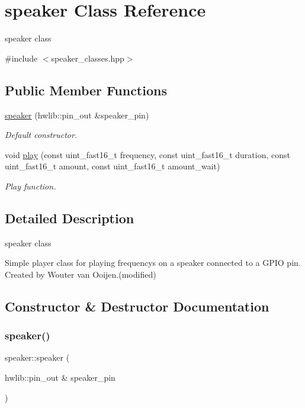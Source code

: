\hypertarget{classspeaker}{}\section{speaker Class Reference}
\label{classspeaker}


speaker class  




{\ttfamily \#include $<$speaker\+\_\+classes.\+hpp$>$}

\subsection*{Public Member Functions}
\begin{DoxyCompactItemize}
\item 
\hyperlink{classspeaker_a3c4dcbdc5d9cc99e1fa6c30dea0235c3}{speaker} (hwlib\+::pin\+\_\+out \&speaker\+\_\+pin)
\begin{DoxyCompactList}\small\item\em Default constructor. \end{DoxyCompactList}\item 
void \hyperlink{classspeaker_a625c84e34f9ee40a7baeb2d6baa816a1}{play} (const uint\+\_\+fast16\+\_\+t frequency, const uint\+\_\+fast16\+\_\+t duration, const uint\+\_\+fast16\+\_\+t amount, const uint\+\_\+fast16\+\_\+t amount\+\_\+wait)
\begin{DoxyCompactList}\small\item\em Play function. \end{DoxyCompactList}\end{DoxyCompactItemize}


\subsection{Detailed Description}
speaker class 

Simple player class for playing frequency\textquotesingle{}s on a speaker connected to a G\+P\+IO pin. Created by Wouter van Ooijen.(modified) 

\subsection{Constructor \& Destructor Documentation}
\hypertarget{classspeaker_a3c4dcbdc5d9cc99e1fa6c30dea0235c3}{}\label{classspeaker_a3c4dcbdc5d9cc99e1fa6c30dea0235c3} 
\subsubsection{\texorpdfstring{speaker()}{speaker()}}
{\footnotesize\ttfamily speaker\+::speaker (\begin{DoxyParamCaption}\item[{hwlib\+::pin\+\_\+out \&}]{speaker\+\_\+pin }\end{DoxyParamCaption})\hspace{0.3cm}{\ttfamily [inline]}}



